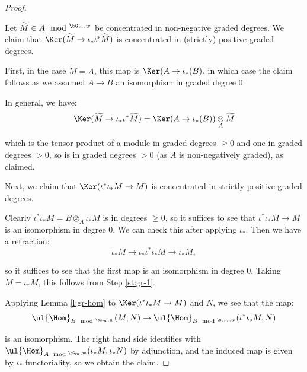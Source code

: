 \begin{proof}

\step\label{st:gr-1}

Let $\widetilde{M} \in A\mod^{\bG_m,w}$ be concentrated in non-negative graded degrees.
We claim that $\Ker(\widetilde{M} \to \iota_*\iota^* \widetilde{M})$ is concentrated
in (strictly) positive graded degrees.

First, in the case $\widetilde{M} = A$, this map is $\Ker(A \to \iota_*(B)$, in which case
the claim follows as we assumed $A \to B$ an isomorphism in graded degree $0$.

In general, we have:
%
\[
\Ker(\widetilde{M} \to \iota_*\iota^* \widetilde{M}) = \Ker(A \to \iota_*(B))  \underset{A}{\otimes}
\widetilde{M}
\]

 which is the tensor product of a module in graded degrees $\geq 0$ and one in graded degrees $>0$, so
is in graded degrees $>0$ (as $A$ is non-negatively graded), as claimed.

\step\label{st:gr-2}

Next, we claim that $\Ker(\iota^*\iota_* M \to M)$ is concentrated in strictly positive graded degrees.

Clearly $\iota^*\iota_* M = B \otimes_A \iota_* M$ is in degrees $\geq 0$, so it suffices to see that
$\iota^*\iota_* M \to M$ is an isomorphism in degree $0$. We can check this after applying $\iota_*$.
Then we have a retraction:
%
\[
\iota_* M \to \iota_* \iota^*\iota_* M \to \iota_* M,
\]

 so it suffices to see that the first map is an isomorphism in degree $0$.
Taking $\widetilde{M} = \iota_*M$, this follows from Step \ref{st:gr-1}.

\step Applying Lemma \ref{l:gr-hom} to $\Ker(\iota^*\iota_*M \to M)$ and $N$, we see that the map:
%
\[
\ul{\Hom}_{B\mod^{\bG_m,w}}(M,N) \to \ul{\Hom}_{B\mod^{\bG_m,w}}(\iota^*\iota_*M,N)
\]

 is an isomorphism. The right hand side identifies with $\ul{\Hom}_{A\mod^{\bG_m,w}}(\iota_*M,\iota_*N)$
by adjunction, and the induced map is given by $\iota_*$ functoriality, so we obtain the claim.

\end{proof}

\subsubsection{}

